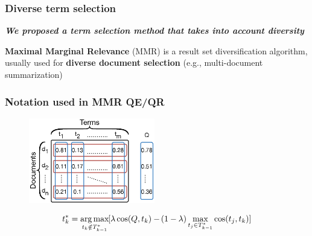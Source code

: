 \documentclass[xcolor=x11names,compress]{beamer}
\DeclareMathOperator*{\argmax}{arg\,max}
\renewcommand{\(}{\begin{columns}}
\renewcommand{\)}{\end{columns}}
\newcommand{\<}[1]{\begin{column}{#1}}
\renewcommand{\>}{\end{column}}
\begin{document}
\begin{frame}
\frametitle{Diverse term selection}

{\color{DeepSkyBlue4}\textit{\textbf{\textbf{We proposed a term selection method that takes into account diversity}}}}

\vspace{0.3cm}

\textbf{Maximal Marginal Relevance} (MMR) \citep{Carbonell1998} is a result set diversification algorithm, usually used for \textbf{diverse document selection} (e.g., multi-document summarization) 
\end{frame}


\begin{frame}
\frametitle{Notation used in MMR QE/QR}

\begin{figure}
\begin{center}
\includegraphics[width=5.5cm]{../img/matrix} 
\par\end{center}
\vspace{-1mm}
\label{fig:notation} 
\end{figure}

\begin{equation}
t_{k}^{*}=\argmax_{t_{k}\notin T_{k-1}^{*}}\hspace{-0.3mm}[\lambda\cos(Q,t_{k})-\hspace{-0.3mm}(1-\lambda)\max_{t_{j}\in T_{k-1}^{*}}\cos(t_{j},t_{k})]
\end{equation}




\end{frame}
\end{document}
